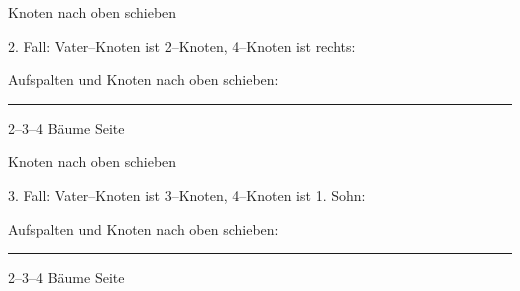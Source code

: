 
\begin{slide}{}
\normalsize

\begin{center}
Knoten nach oben schieben 
\end{center}
\vspace*{0.5cm}

\footnotesize
2. Fall: Vater--Knoten ist 2--Knoten, 4--Knoten ist rechts:

\hspace*{1.3cm} 

Aufspalten und Knoten nach oben schieben:

\hspace*{1.3cm} 


\vspace*{\fill}
\tiny \addtocounter{mypage}{1}
\rule{17cm}{1mm}
2--3--4 B\"aume  \hspace*{\fill} Seite 
\end{slide}


\begin{slide}{}
\normalsize

\begin{center}
Knoten nach oben schieben 
\end{center}
\vspace*{0.5cm}

\footnotesize
3. Fall: Vater--Knoten ist 3--Knoten, 4--Knoten ist 1. Sohn:

\hspace*{1.3cm} 

Aufspalten und Knoten nach oben schieben:

\hspace*{1.3cm} 


\vspace*{\fill}
\tiny \addtocounter{mypage}{1}
\rule{17cm}{1mm}
2--3--4 B\"aume  \hspace*{\fill} Seite 
\end{slide}


